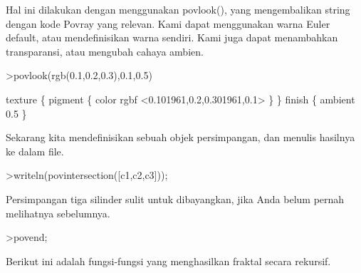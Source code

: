 \documentclass{article}
\begin{document}
\begin{eulernotebook}
\begin{eulercomment}
Hal ini dilakukan dengan menggunakan povlook(), yang mengembalikan
string dengan kode Povray yang relevan. Kami dapat menggunakan warna
Euler default, atau mendefinisikan warna sendiri. Kami juga dapat
menambahkan transparansi, atau mengubah cahaya ambien.
\end{eulercomment}
\begin{eulerprompt}
>povlook(rgb(0.1,0.2,0.3),0.1,0.5)
\end{eulerprompt}
\begin{euleroutput}
   texture \{ pigment \{ color rgbf <0.101961,0.2,0.301961,0.1> \}  \} 
   finish \{ ambient 0.5 \} 
  
\end{euleroutput}
\begin{eulercomment}
Sekarang kita mendefinisikan sebuah objek persimpangan, dan menulis
hasilnya ke dalam file.
\end{eulercomment}
\begin{eulerprompt}
>writeln(povintersection([c1,c2,c3]));
\end{eulerprompt}
\begin{eulercomment}
Persimpangan tiga silinder sulit untuk dibayangkan, jika Anda belum
pernah melihatnya sebelumnya.
\end{eulercomment}
\begin{eulerprompt}
>povend;
\end{eulerprompt}
\begin{eulercomment}
Berikut ini adalah fungsi-fungsi yang menghasilkan fraktal secara
rekursif.


\end{eulercomment}
\end{eulernotebook}
\end{document}
